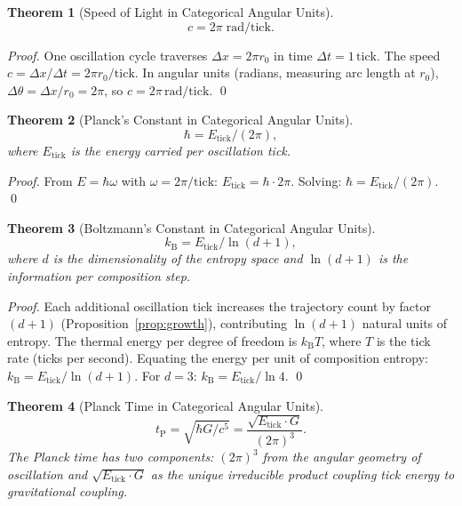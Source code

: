 \documentclass[twocolumn,10pt,a4paper]{article}
\theoremstyle{thmstyle}
\newtheorem{theorem}{Theorem}[section]
\theoremstyle{definition}
\theoremstyle{remark}
\newcommand{\tP}{t_{\mathrm{P}}}
\newcommand{\kB}{k_{\mathrm{B}}}
\begin{document}
\begin{theorem}[Speed of Light in Categorical Angular Units]
\label{thm:c-angular}
\begin{equation}
c = 2\pi\;\mathrm{rad/tick}.
\end{equation}
\end{theorem}

\begin{proof}
One oscillation cycle traverses $\Delta x = 2\pi r_0$ in time
$\Delta t = 1\,\mathrm{tick}$. The speed $c = \Delta x/\Delta t
= 2\pi r_0/\mathrm{tick}$. In angular units (radians, measuring
arc length at $r_0$), $\Delta\theta = \Delta x/r_0 = 2\pi$, so
$c = 2\pi\,\mathrm{rad/tick}$. \qed
\end{proof}

\begin{theorem}[Planck's Constant in Categorical Angular Units]
\label{thm:hbar-angular}
\begin{equation}
\hbar = E_{\mathrm{tick}} / (2\pi),
\end{equation}
where $E_{\mathrm{tick}}$ is the energy carried per oscillation tick.
\end{theorem}

\begin{proof}
From $E = \hbar\omega$ with $\omega = 2\pi/\mathrm{tick}$:
$E_{\mathrm{tick}} = \hbar \cdot 2\pi$. Solving: $\hbar =
E_{\mathrm{tick}}/(2\pi)$. \qed
\end{proof}

\begin{theorem}[Boltzmann's Constant in Categorical Angular Units]
\label{thm:kB-angular}
\begin{equation}
\kB = E_{\mathrm{tick}} / \ln(d+1),
\end{equation}
where $d$ is the dimensionality of the entropy space and $\ln(d+1)$
is the information per composition step.
\end{theorem}

\begin{proof}
Each additional oscillation tick increases the trajectory count by
factor $(d+1)$ (Proposition~\ref{prop:growth}), contributing
$\ln(d+1)$ natural units of entropy. The thermal energy per degree of
freedom is $\kB T$, where $T$ is the tick rate (ticks per second).
Equating the energy per unit of composition entropy: $\kB =
E_{\mathrm{tick}}/\ln(d+1)$. For $d = 3$: $\kB = E_{\mathrm{tick}}/
\ln 4$. \qed
\end{proof}

\begin{theorem}[Planck Time in Categorical Angular Units]
\label{thm:tP-angular}
\[
\tP = \sqrt{\hbar G / c^5} = \frac{\sqrt{E_{\mathrm{tick}} \cdot G}}{(2\pi)^3}.
\]
The Planck time has two components: $(2\pi)^3$ from the angular
geometry of oscillation and $\sqrt{E_{\mathrm{tick}} \cdot G}$ as
the unique irreducible product coupling tick energy to gravitational
coupling.
\end{theorem}
\end{document}
